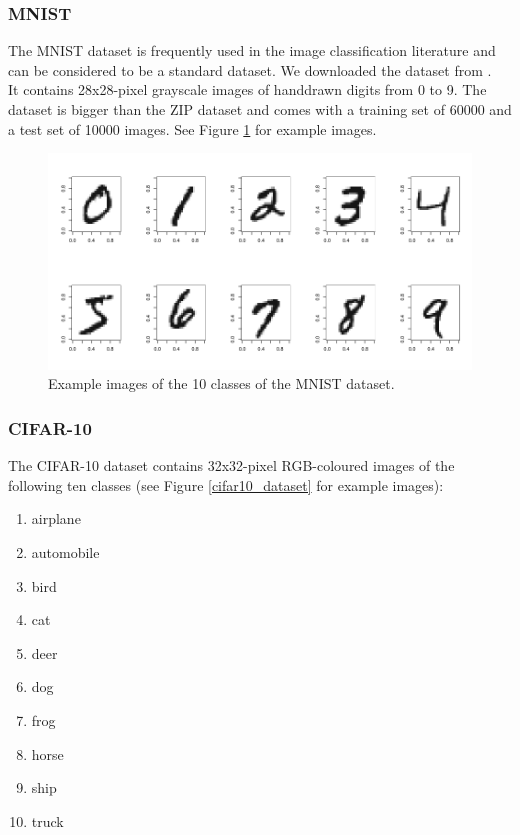 \subsubsection{MNIST}

The MNIST dataset is frequently used in the image classification literature
and can be considered to be a standard dataset.
We downloaded the dataset from \cite{mnist}.\\
It contains 28x28-pixel grayscale images of handdrawn digits from 0 to 9.
The dataset is bigger than the ZIP dataset and comes with a training set of 60000 and a test set of 10000 images.
See Figure \ref{mnist_dataset} for example images.\\

\begin{figure}
 \includegraphics[width=\textwidth]{../plots/mnist_dataset}
 \caption{Example images of the 10 classes of the MNIST dataset.}
 \label{mnist_dataset}
\end{figure}


\subsubsection{CIFAR-10}

The CIFAR-10 dataset contains 32x32-pixel RGB-coloured images of the following ten classes
(see Figure \ref{cifar10_dataset} for example images):
\begin{enumerate}
 \item airplane
 \item automobile
 \item bird
 \item cat
 \item deer
 \item dog
 \item frog
 \item horse
 \item ship
 \item truck
\end{enumerate}

